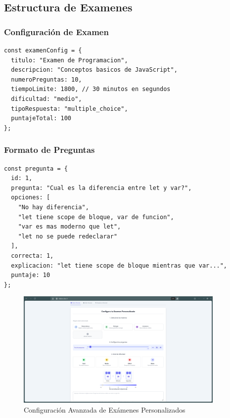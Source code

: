 \documentclass[12pt,a4paper]{report}
\begin{document}
\subsection{Estructura de Examenes}

\subsubsection{Configuración de Examen}
\begin{lstlisting}
const examenConfig = {
  titulo: "Examen de Programacion",
  descripcion: "Conceptos basicos de JavaScript",
  numeroPreguntas: 10,
  tiempoLimite: 1800, // 30 minutos en segundos
  dificultad: "medio",
  tipoRespuesta: "multiple_choice",
  puntajeTotal: 100
};
\end{lstlisting}

\subsubsection{Formato de Preguntas}
\begin{lstlisting}
const pregunta = {
  id: 1,
  pregunta: "Cual es la diferencia entre let y var?",
  opciones: [
    "No hay diferencia",
    "let tiene scope de bloque, var de funcion",
    "var es mas moderno que let",
    "let no se puede redeclarar"
  ],
  correcta: 1,
  explicacion: "let tiene scope de bloque mientras que var...",
  puntaje: 10
};
\end{lstlisting}

\begin{figure}[h]
\centering
\includegraphics[width=0.9\textwidth]{250617_06h45m25s_screenshot.png}
\caption{Configuración Avanzada de Exámenes Personalizados}
\label{fig:configuracion_avanzada}
\end{figure}
\end{document}

